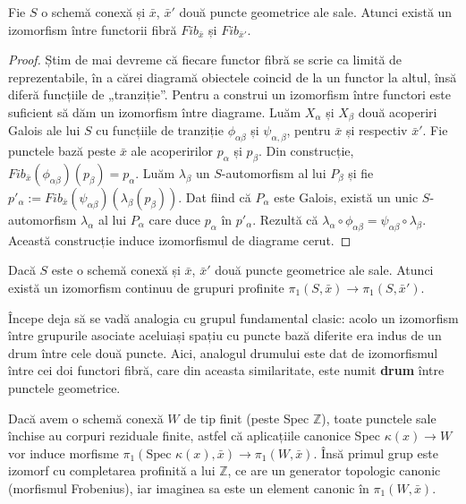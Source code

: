 \documentclass[13pt,openany]{book}
\begin{document}
\begin{prop}
Fie $S$ o schemă conexă și $\bar{x}$, $\bar{x}'$ două puncte geometrice ale sale. Atunci există un izomorfism între functorii fibră $Fib_{\bar{x}}$ și $Fib_{\bar{x}'}$.
\end{prop}

\begin{proof}
Știm de mai devreme că fiecare functor fibră se scrie ca limită de reprezentabile, în a cărei diagramă obiectele coincid de la un functor la altul, însă diferă funcțiile de „tranziție”. Pentru a construi un izomorfism între functori este suficient să dăm un izomorfism între diagrame. Luăm $X_\alpha$ și $X_\beta$ două acoperiri Galois ale lui $S$ cu funcțiile de tranziție $\phi_{\alpha\beta}$ și $\psi_{\alpha,\beta}$, pentru $\bar{x}$ și respectiv $\bar{x}'$. Fie punctele bază peste $\bar{x}$ ale acoperirilor $p_\alpha$ și $p_\beta$. Din construcție, $Fib_{\bar{x}}(\phi_{\alpha\beta})(p_\beta)=p_\alpha$. Luăm $\lambda_\beta$ un $S$-automorfism al lui $P_\beta$ și fie $p'_\alpha:=Fib_{\bar{x}}(\psi_{\alpha\beta})(\lambda_\beta(p_\beta))$. Dat fiind că $P_\alpha$ este Galois, există un unic $S$-automorfism $\lambda_\alpha$ al lui $P_\alpha$ care duce $p_\alpha$ în $p'_\alpha$. Rezultă că $\lambda_\alpha \circ \phi_{\alpha\beta} = \psi_{\alpha\beta} \circ \lambda_\beta$. Această construcție induce izomorfismul de diagrame cerut.
\end{proof}

\begin{cor}
Dacă $S$ este o schemă conexă și $\bar{x}$, $\bar{x}'$ două puncte geometrice ale sale. Atunci există un izomorfism continuu de grupuri profinite $\pi_1(S,\bar{x}) \rightarrow \pi_1(S,\bar{x}')$.
\end{cor}

Începe deja să se vadă analogia cu grupul fundamental clasic: acolo un izomorfism între grupurile asociate aceluiași spațiu cu puncte bază diferite era indus de un drum între cele două puncte. Aici, analogul drumului este dat de izomorfismul între cei doi functori fibră, care din aceasta similaritate, este numit {\bf drum} între punctele geometrice.

Dacă avem o schemă conexă $W$ de tip finit (peste Spec $\mathbb{Z}$), toate punctele sale închise au corpuri reziduale finite, astfel că aplicațiile canonice Spec $\kappa(x) \rightarrow W$ vor induce morfisme $\pi_1(\text{Spec }\kappa(x),\bar{x}) \rightarrow \pi_1(W,\bar{x})$. Însă primul grup este izomorf cu completarea profinită a lui $\mathbb{Z}$, ce are un generator topologic canonic (morfismul Frobenius), iar imaginea sa este un element canonic în $ \pi_1(W,\bar{x})$.
\end{document}
